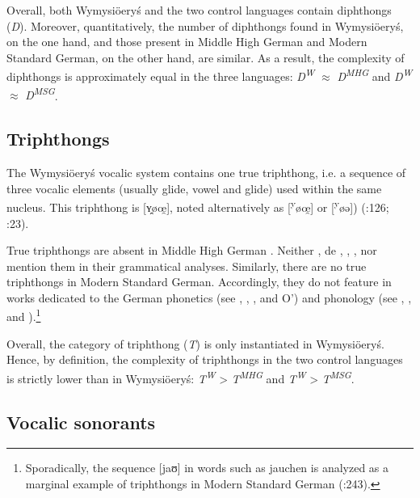 \documentclass[output=paper]{langscibook}
\begin{document}
Overall, both Wymysiöeryś and the two control languages contain diphthongs (\textit{D}). Moreover, quantitatively, the number of diphthongs found in Wymysiöeryś, on the one hand, and those present in Middle High German and Modern Standard German, on the other hand, are similar. As a result, the complexity of diphthongs is approximately equal in the three languages: \textit{D\textsuperscript{W}} ${\approx}$ \textit{D\textsuperscript{MHG} }and \textit{D\textsuperscript{W}} ${\approx}$ \textit{D\textsuperscript{MSG}}.


\subsection{Triphthongs}\label{sec:wymsorys:3.3}


The Wymysiöeryś vocalic system contains one true triphthong, i.e. a sequence of three vocalic elements (usually glide, vowel and glide) used within the same nucleus. This triphthong is [ʏ̯øœ̯], noted alternatively as [\textsuperscript{y}øœ̯] or [\textsuperscript{y}øə]) (\citealt{Andrason2014b}:126; \citealt{AndrasonKról2016}:23).


True triphthongs are absent in Middle High German \citep[10]{Hall2017}. Neither \citet{Wright1917}, de \citet{BoorWisniewski1973}, \citet{Simmler1985}, \citet{Paul2007}, nor \citet{Schmidt2017} mention them in their grammatical analyses. Similarly, there are no true triphthongs in Modern Standard German. Accordingly, they do not feature in works dedicated to the German phonetics (see \citealt{Eisenberg1994}, \citealt{JohnsonBraber2008}, \citealt{Fagan2009}, and O’\citealt{BrienFagan2016}) and phonology (see \citealt{Russ1994}, \citealt{Wiese1996}, and \citealt{Fox2005}).\footnote{Sporadically, the sequence [jaʊ] in words such as jauchen is analyzed as a marginal example of triphthongs in Modern Standard German (\citealt{AbramsEtAl2017}:243).} 

Overall, the category of triphthong (\textit{T}) is only instantiated in Wymysiöeryś. Hence, by definition, the complexity of triphthongs in the two control languages is strictly lower than in Wymysiöeryś: \textit{T\textsuperscript{W}} > \textit{T\textsuperscript{MHG} }and \textit{T\textsuperscript{W}} > \textit{T\textsuperscript{MSG}}.

\subsection{Vocalic sonorants}\label{sec:wymsorys:3.4}
\end{document}
